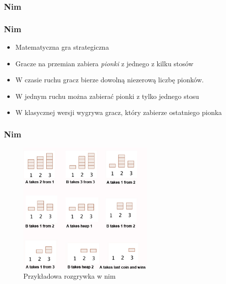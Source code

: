 \documentclass[polish,envcountsect,10pt]{beamer}
\begin{document}
            \subsubsection{Nim}
                \begin{frame}
                    \frametitle{Nim} 
                        \begin{itemize}
                            \item<1-> Matematyczna gra strategiczna
                            \item<2-> Gracze na przemian zabiera \textit{pionki} z jednego z kilku stosów
                            \item<3-> W czasie ruchu gracz bierze dowolną niezerową liczbę pionków.
                            \item<4-> W jednym ruchu można zabierać pionki z tylko jednego stosu
                            \item<5-> W klasycznej wersji wygrywa gracz, który zabierze ostatniego pionka
                        \end{itemize}               
                \end{frame}
                \begin{frame}
                    \frametitle{Nim}
                    \begin{figure}[H]
                        \centering
                        \includegraphics[width=0.6\textwidth]{images/nim_game}
                        \caption{Przykładowa rozgrywka w nim}
                    \end{figure}
                \end{frame}
\end{document}
